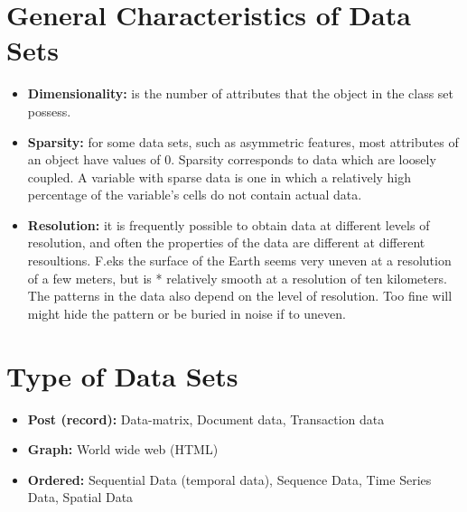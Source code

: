 	\section{General Characteristics of Data Sets}
			\begin{itemize}
				\item {\bf Dimensionality:} is the number of attributes that the object in the 
				class set possess.
				\item {\bf Sparsity:} for some data sets, such as asymmetric features, most
				attributes of an object have values of 0. Sparsity corresponds to data which are loosely coupled.
				A variable with sparse data is one in which a relatively high percentage of the variable's 
				cells do not contain actual data.
				\item {\bf Resolution:} it is frequently possible to obtain data at different levels of
				resolution, and often the properties of the data are different at different resoultions.
				F.eks the surface of the Earth seems very uneven at a resolution of a few meters, but is *
				relatively smooth at a resolution of ten kilometers. The patterns in the data also depend
				on the level of resolution. Too fine will might hide the pattern or be buried in noise if
				to uneven. 
			\end{itemize}
	
	\section{Type of Data Sets}
		\begin{itemize}
			\item {\bf Post (record):} Data-matrix, Document data, Transaction data 
			\item {\bf Graph:} World wide web (HTML)
			\item {\bf Ordered:} Sequential Data (temporal data), Sequence Data, Time Series Data,
			Spatial Data
		\end{itemize}

		\clearpage
